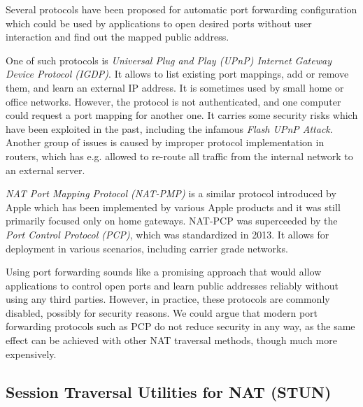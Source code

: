 Several protocols have been proposed for automatic port forwarding configuration which could be used by applications to open desired ports without user interaction and find out the mapped public address.

One of such protocols is \textit{Universal Plug and Play (UPnP) Internet Gateway Device Protocol (IGDP)}. It allows to list existing port mappings, add or remove them, and learn an external IP address. It is sometimes used by small home or office networks. However, the protocol is not authenticated, and one computer could request a port mapping for another one. It carries some security risks which have been exploited in the past, including the infamous \textit{Flash UPnP Attack}. Another group of issues is caused by improper protocol implementation in routers, which has e.g. allowed to re-route all traffic from the internal network to an external server. \cite{upnpbugs}

\textit{NAT Port Mapping Protocol (NAT-PMP)} is a similar protocol introduced by Apple which has been implemented by various Apple products and it was still primarily focused only on home gateways. NAT-PCP was superceeded by the \textit{Port Control Protocol (PCP)}, which was standardized in 2013. \cite{pcp} It allows for deployment in various scenarios, including carrier grade networks.

Using port forwarding sounds like a promising approach that would allow applications to control open ports and learn public addresses reliably without using any third parties. However, in practice, these protocols are commonly disabled, possibly for security reasons. We could argue that modern port forwarding protocols such as PCP do not reduce security in any way, as the same effect can be achieved with other NAT traversal methods, though much more expensively.



\subsection{Session Traversal Utilities for NAT (STUN)}

